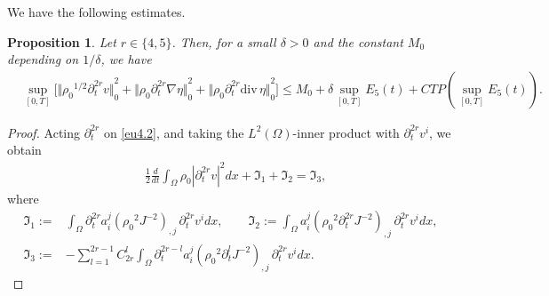 \documentclass[12pt,twoside,reqno]{amsart}
\numberwithin{equation}{section}
\newtheorem{proposition}[theorem]{Proposition}
\theoremstyle{definition}
\theoremstyle{remark}
\begin{document}
We have the following estimates.

\begin{proposition}
  Let $r\in\{4,5\}$. Then, for a small $\delta>0$ and the constant $M_0$ depending on $1/\delta$, we have
  \begin{align*}
    &\sup_{[0,T]}\Big[{\Vert{{\rho_0}^{1/2}{\partial}_t^{2r} v}\Vert}_0^2+{\Vert{{\rho_0}  {\partial}_t^{2r}{\nabla} \eta}\Vert}_0^2 +{\Vert{{\rho_0}  {\partial}_t^{2r}{\mathrm{div}\,} \eta}\Vert}_0^2\Big]
    {\leqslant}  M_0+\delta\sup_{[0,T]}E_5(t)+CTP(\sup_{[0,T]}E_5(t)).
  \end{align*}
\end{proposition}

\begin{proof}
Acting ${\partial}_t^{2r}$ on \eqref{eu4.2}, and taking the $L^2(\Omega)$-inner product with ${\partial}_t^{2r}v^i$, we obtain
\begin{align*}
&\frac{1}{2}\frac{d}{dt}\int_\Omega {\rho_0} |{\partial}_t^{2r} v|^2dx+{\mathfrak{I}}_1+{\mathfrak{I}}_2 ={\mathfrak{I}}_3,
\end{align*}
where
\begin{align*}
  {\mathfrak{I}}_1:=&\int_\Omega {\partial}_t^{2r}a^j_i{{{\left({\rho_0}^2  J^{-2}\right)}}_{,{j}}\,}{\partial}_t^{2r}v^idx,\qquad
  {\mathfrak{I}}_2:=\int_\Omega a^j_i{{{\left({\rho_0}^2  {\partial}_t^{2r} J^{-2}\right)}}_{,{j}}\,}{\partial}_t^{2r}v^idx,\\
  {\mathfrak{I}}_3:=&-\sum_{l=1}^{2r-1}C_{2r}^l\int_\Omega {\partial}_t^{2r-l}a_i^j {{{\left({\rho_0}^2  {\partial}_t^l J^{-2}\right)}}_{,{j}}\,} {\partial}_t^{2r}v^idx.
\end{align*}


\end{proof}
\end{document}
